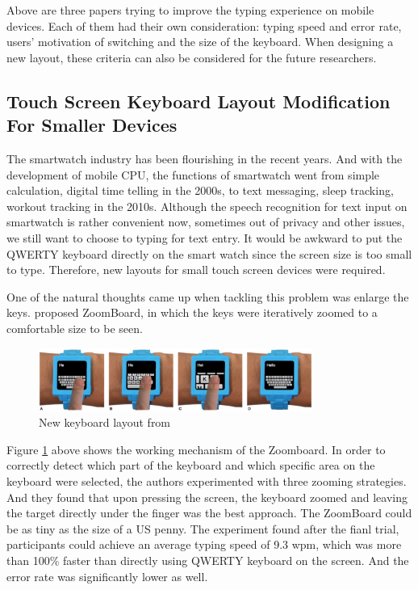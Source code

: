 \documentclass[11pt]{article}
\begin{document}
Above are three papers trying to improve the typing experience on mobile devices. Each of them had their own consideration: typing speed and error rate, users' motivation of switching and the size of the keyboard. When designing a new layout, these criteria can also be considered for the future researchers.

\subsection{Touch Screen Keyboard Layout Modification For Smaller Devices}

The smartwatch industry has been flourishing in the recent years. And with the development of mobile CPU, the functions of smartwatch went from simple calculation, digital time telling in the 2000s, to text messaging, sleep tracking, workout tracking in the 2010s. Although the speech recognition for text input on smartwatch is rather convenient now, sometimes out of privacy and other issues, we still want to choose to typing for text entry. It would be awkward to put the QWERTY keyboard directly on the smart watch since the screen size is too small to type. Therefore, new layouts for small touch screen devices were required.

One of the natural thoughts came up when tackling this problem was enlarge the keys. \citet{10.1145/2470654.2481387} proposed ZoomBoard, in which the keys were iteratively zoomed to a comfortable size to be seen.

\begin{figure}[H]
  \centering
  \includegraphics[width=0.8\textwidth]{ZoomBoard.png}
  \caption{New keyboard layout from \citep{10.1145/2470654.2481387}}
  \label{fig:zoomboard}
\end{figure}

Figure \ref{fig:zoomboard} above shows the working mechanism of the Zoomboard. In order to correctly detect which part of the keyboard and which specific area on the keyboard were selected, the authors  experimented with three zooming strategies. And they found that upon pressing the screen, the keyboard zoomed and leaving the target directly under the finger was the best approach. The ZoomBoard could be as tiny as the size of a US penny. The experiment found after the fianl trial, participants could achieve an average typing speed of 9.3 wpm, which was more than 100\% faster than directly using QWERTY keyboard on the screen. And the error rate was significantly lower as well.
\end{document}
